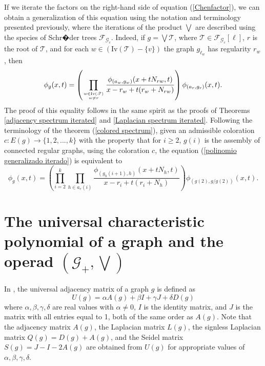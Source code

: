 \documentclass[11pt]{article}
\theoremstyle{definition}
\begin{document}
If we iterate the factors on the right-hand side of equation (\ref{Chenfactor}), we can obtain a generalization of this equation using the notation and terminology presented previously, where the iterations of the product $\bigvee$ are described using the species of Schr�der trees $\mathscr{F}_{\mathscr{G}_c}$. Indeed, if $g=\bigvee \mathscr{T}$, where $\mathscr{T}\in \mathscr{F}_{\mathscr{G}_c}[\ell]$, $r$ is the root of $\mathscr{T}$, and for each $w\in (\mathrm{Iv}(\mathscr{T})-\{v\})$ the graph $g_{\ell_w}$ has regularity $r_w$, then
\begin{equation}\label{polinomio generalizado iterado}
    \phi_g(x,t)=\left(\prod_{w\in \mathrm{Iv}(\mathscr{T})\atop w\neq r} \dfrac{\phi_{(a_w, g_w)}(x+tN_{rw},t)}{x-r_w+t(r_w+N_{rw})}\right)\phi_{(a_r, g_r)}(x,t).
\end{equation}
The proof of this equality follows in the same spirit as the proofs of Theorems \ref{adjacency spectrum iterated} and \ref{Laplacian spectrum iterated}.
Following the terminology of the theorem (\ref{colored spectrum}), given an admissible coloration $c: E(g)\longrightarrow \{1,2,...,k\}$ with the property that for $i\geq 2$, $g(i)$ is the assembly of connected regular graphs, using the coloration $c$, the equation (\ref{polinomio generalizado iterado}) is equivalent to
\begin{equation}\label{polinomio generalizado coloreado}
    \phi_g(x,t)=\left(\prod^k_{i=2}\prod_{h\in a_c(i)} \dfrac{\phi_{(g_h(i+1), h)}(x+tN_h,t)}{x-r_i+t(r_i+N_h)}\right) \phi_{(g(2), g/g(2))}(x,t).
\end{equation}

\section{The universal characteristic polynomial of a graph and the operad $(\mathscr{G}_+, \bigvee)$}

In \cite{Saravanan2021}, the universal adjacency matrix of a graph $g$ is defined as
\[U(g)=\alpha A(g)+ \beta I + \gamma J+ \delta D(g)\]
where \( \alpha, \beta, \gamma, \delta \) are real values with \( \alpha \neq 0 \), \( I \) is the identity matrix, and \( J \) is the matrix with all entries equal to 1, both of the same order as \( A(g) \). Note that the adjacency matrix \( A(g) \), the Laplacian matrix \( L(g) \), the signless Laplacian matrix \( Q(g) = D(g) + A(g) \), and the Seidel matrix \( S(g) = J - I - 2A(g) \) are obtained from \( U(g) \) for appropriate values of \( \alpha, \beta, \gamma, \delta \).
\end{document}
